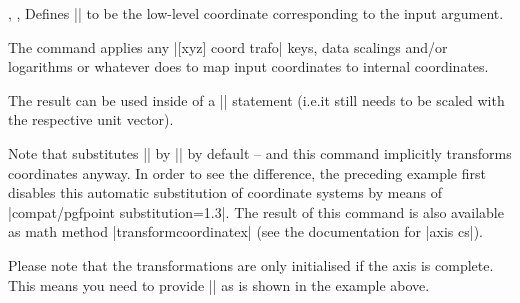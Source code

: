 \begin{commandlist}{%
    \pgfplotstransformcoordinatex{},
    \pgfplotstransformcoordinatey{},
    \pgfplotstransformcoordinatez{}%
}
    Defines |\pgfmathresult| to be the low-level \PGF{} coordinate
    corresponding to the input argument.

    The command applies any |[xyz] coord trafo| keys, data scalings and/or
    logarithms or whatever \PGFPlots{} does to map input coordinates to
    internal coordinates.

    The result can be used inside of a |\pgfpointxy| statement (i.e.\@ it still
    needs to be scaled with the respective \PGF{} unit vector).
\begin{codeexample}[]
\end{codeexample}
    Note that \PGFPlots{} substitutes |\pgfqpointxy| by |\pgfplotspointaxisxyz|
    by default -- and this command implicitly transforms coordinates anyway. In
    order to see the difference, the preceding example first disables this
    automatic substitution of coordinate systems by means of
    |compat/pgfpoint substitution=1.3|.
    The result of this command is also available as math method
    |transformcoordinatex| (see the documentation for |axis cs|).

    Please note that the transformations are only initialised if the axis is
    complete. This means you need to provide |\pgfplotsextra| as is shown in
    the example above.
\end{commandlist}

